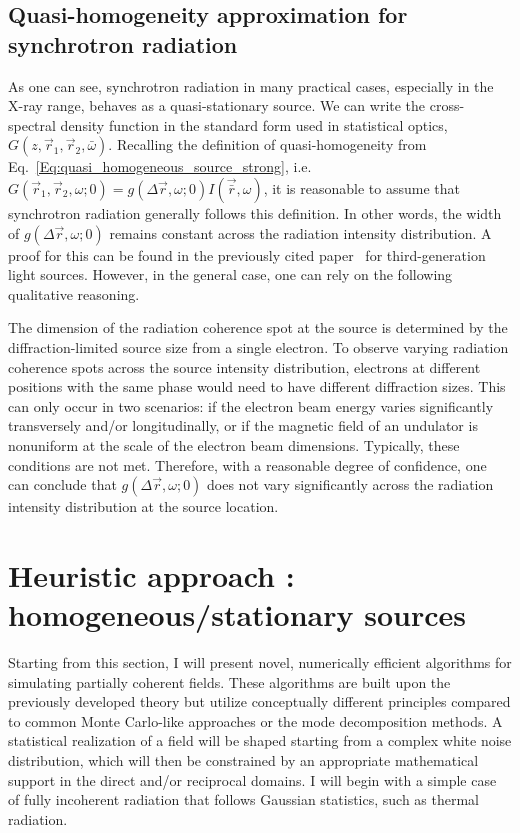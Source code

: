 \subsection{Quasi-homogeneity approximation for synchrotron radiation}

    As one can see, synchrotron radiation in many practical cases, especially in the X-ray range, behaves as a quasi-stationary source. We can write the cross-spectral density function in the standard form used in statistical optics, $G(z, \vec{r}_1, \vec{r}_2, \bar{\omega})$. Recalling the definition of quasi-homogeneity from Eq.~\ref{Eq:quasi_homogeneous_source_strong}, i.e. $G(\vec{r}_1, \vec{r}_2, \omega; 0) =  g(\Delta \vec{r}, \omega; 0)I(\vec{\bar{r}}, \omega)$, it is reasonable to assume that synchrotron radiation generally follows this definition. In other words, the width of $g(\Delta \vec{r}, \omega; 0)$ remains constant across the radiation intensity distribution. A proof for this can be found in the previously cited paper~\cite{geloni_transverse_2008} for third-generation light sources. However, in the general case, one can rely on the following qualitative reasoning.
    
    The dimension of the radiation coherence spot at the source is determined by the diffraction-limited source size from a single electron. To observe varying radiation coherence spots across the source intensity distribution, electrons at different positions with the same phase would need to have different diffraction sizes. This can only occur in two scenarios: if the electron beam energy varies significantly transversely and/or longitudinally, or if the magnetic field of an undulator is nonuniform at the scale of the electron beam dimensions. Typically, these conditions are not met. Therefore, with a reasonable degree of confidence, one can conclude that $g(\Delta \vec{r}, \omega; 0)$ does not vary significantly across the radiation intensity distribution at the source location.

\setcounter{mycounter}{1}
\section{Heuristic approach : homogeneous/stationary sources}
\label{Sec:SERVAL0}
    
    Starting from this section, I will present novel, numerically efficient algorithms for simulating partially coherent fields. These algorithms are built upon the previously developed theory but utilize conceptually different principles compared to common Monte Carlo-like approaches or the mode decomposition methods. A statistical realization of a field will be shaped starting from a complex white noise distribution, which will then be constrained by an appropriate mathematical support in the direct and/or reciprocal domains. I will begin with a simple case of fully incoherent radiation that follows Gaussian statistics, such as thermal radiation.

